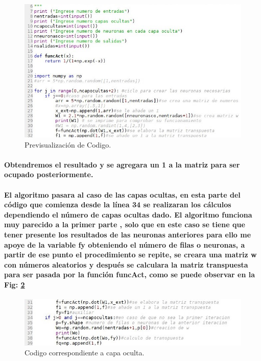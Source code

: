 \documentclass[10pt,a4paper]{article}
\begin{document}
\begin{figure}[H]
\includegraphics[scale=0.7] {cod1.jpg}
\caption{Previsualizaci\'on de Codigo.}
\label{fig:cod1}
\end{figure}
 
\paragraph{Obtendremos el resultado y se agregara un 1 a la matriz para ser ocupado posteriormente.}
\paragraph{El algoritmo pasara al caso de las capas ocultas, en esta parte del c\'odigo que comienza desde la línea 34 se realizaran los c\'alculos dependiendo el n\'umero de capas ocultas dado. El algoritmo funciona muy parecido a la primer parte , solo que en este caso se tiene que tener presente los resultados de las neuronas anteriores para ello me apoye de la variable fy obteniendo el n\'umero de filas o neuronas, a partir de ese punto el procedimiento se repite, se creara una matriz w con n\'umeros aleatorios y despu\'es se calculara la matriz transpuesta para ser pasada por la funci\'on funcAct, como se puede observar en la Fig: \ref{fig:cod2}}

\begin{figure}[H]
\includegraphics[scale=0.7] {cod2.jpg}
\caption{Codigo correspondiente a capa oculta.}
\label{fig:cod2}
\end{figure}
\end{document}

